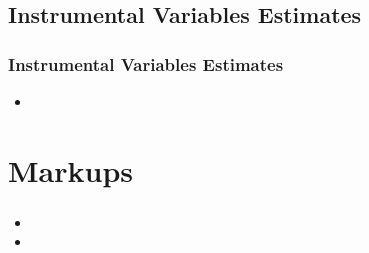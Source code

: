 \documentclass{beamer}
\begin{document}
\subsection{Instrumental Variables Estimates}
\begin{frame}
\frametitle{Instrumental Variables Estimates}
\begin{itemize}
\item 
\end{itemize}
\end{frame}

\section{Markups}
\begin{frame}
\frametitle{}
\begin{itemize}
\item 
\item 
\end{itemize}
\end{frame}
\end{document}
